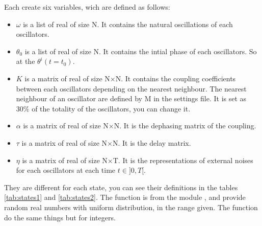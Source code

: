 \documentclass[1pt, a4paper]{article}
\begin{document}
Each  create six variables, wich are defined as follows:
\begin{itemize}
        \item $\omega$ is a list of real of size N. It contains the natural oscillations of each oscillators.
        \item $\theta_0$ is a list of real of size N. It contains the intial phase of each oscillators. So at the $\theta^i(t=t_0)$.
        \item $K$ is a matrix of real of size N$\times$N. It contains the coupling coefficients between each oscillators depending on the nearest neighbour. The nearest neighbour of an oscillator are defined by M in the settings file. It is set as $30\%$ of the totality of the oscillators, you can change it. 
        \item $\alpha$ is a matrix of real of size N$\times$N. It is the dephasing matrix of the coupling.
        \item $\tau$ is a matrix of real of size N$\times$N. It is the delay matrix.
        \item $\eta$ is a matrix of real of size N$\times$T. It is the representations of external noises for each oscillators at each time $t\in ]0, T[$.
\end{itemize}
They are different for each state, you can see their definitions in the tables \ref{tab:states1} and \ref{tab:states2}. The function  is from the module , and provide random real numbers with uniform distribution, in the range given. The function  do the same things but for integers.
\end{document}

